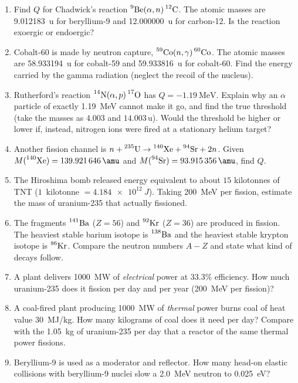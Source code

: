 \begin{enumerate}[itemsep=3pt]
\item Find $Q$ for Chadwick's reaction $\prescript{9}{}{\mathrm{Be}}(\alpha,n)\prescript{12}{}{\mathrm{C}}$. The atomic masses are
      \SI{9.012183}{\amu} for beryllium-9 and \SI{12.000000}{\amu} for carbon-12. Is the reaction
      exoergic or endoergic?
\item Cobalt-60 is made by neutron capture, $\prescript{59}{}{\mathrm{Co}}(n,\gamma)\prescript{60}{}{\mathrm{Co}}$. The atomic masses
      are \SI{58.933194}{\amu} for cobalt-59 and \SI{59.933816}{\amu} for cobalt-60. Find the energy
      carried by the gamma radiation (neglect the recoil of the nucleus).
\item Rutherford's reaction $\prescript{14}{}{\mathrm{N}}(\alpha,p)\prescript{17}{}{\mathrm{O}}$ has $Q=-\SI{1.19}{\MeV}$. Explain why an
      $\alpha$ particle of exactly \SI{1.19}{\MeV} cannot make it go, and find the true threshold (take
      the masses as $4.003$ and $14.003\,\si{\amu}$). Would the threshold be higher or lower if, instead,
      nitrogen ions were fired at a stationary helium target?
\item Another fission channel is $n+\prescript{235}{}{\mathrm{U}}\to\prescript{140}{}{\mathrm{Xe}}+\prescript{94}{}{\mathrm{Sr}}+2n$. Given
      $M(\iso{140}{Xe})=\SI{139.921646}{\amu}$ and $M(\iso{94}{Sr})=\SI{93.915356}{\amu}$, find $Q$.
\item The Hiroshima bomb released energy equivalent to about $15$ kilotonnes of TNT
      ($1$~kilotonne $=\SI{4.184e12}{J}$). Taking \SI{200}{\MeV} per fission, estimate the mass of
      uranium-235 that actually fissioned.
\item The fragments $\prescript{141}{}{\mathrm{Ba}}$ ($Z=56$) and $\prescript{92}{}{\mathrm{Kr}}$ ($Z=36$) are produced in fission. The
      heaviest stable barium isotope is $\prescript{138}{}{\mathrm{Ba}}$ and the heaviest stable krypton isotope is
      $\prescript{86}{}{\mathrm{Kr}}$. Compare the neutron numbers $A-Z$ and state what kind of decays follow.
\item A plant delivers \SI{1000}{MW} of \emph{electrical} power at $33.3\%$ efficiency. How much
      uranium-235 does it fission per day and per year (\SI{200}{\MeV} per fission)?
\item A coal-fired plant producing \SI{1000}{MW} of \emph{thermal} power burns coal of heat value
      \SI{30}{MJ/kg}. How many kilograms of coal does it need per day? Compare with the \SI{1.05}{kg} of
      uranium-235 per day that a reactor of the same thermal power fissions.
\item Beryllium-9 is used as a moderator and reflector. How many head-on elastic collisions with
      beryllium-9 nuclei slow a \SI{2.0}{\MeV} neutron to \SI{0.025}{eV}?

\end{enumerate}
